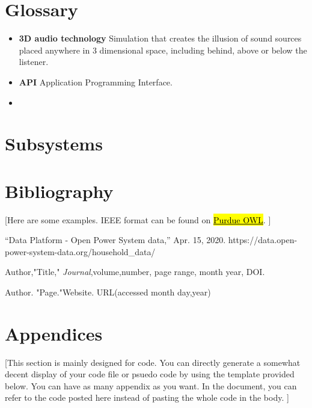 \documentclass[letterpaper, 11pt]{article}
\begin{document}
\clearpage
\section*{Glossary} %
\begin{itemize} %
    \item \textbf{3D audio technology} Simulation that creates
          the illusion of sound sources placed anywhere in 3
          dimensional space, including behind, above or below the listener.
    \item \textbf{API} Application Programming Interface.
    \item
\end{itemize}





\clearpage
\section{Subsystems}





\clearpage
\section{Bibliography}

 [Here are some examples. IEEE format can be found on \href{https://owl.purdue.edu/owl/research_and_citation/ieee_style/ieee_overview.html}{\hl{Purdue OWL}}. ]

\begin{thebibliography}{}

    “Data Platform - Open Power System data,” Apr. 15, 2020. https://data.open-power-system-data.org/household\_data/

    Author,"Title," \emph{Journal},volume,number, page range, month year, DOI.

    Author. "Page."Website. URL(accessed month day,year)

\end{thebibliography}

\clearpage
\section{Appendices}
 [This section is mainly designed for code. You can directly generate a somewhat decent display of your code file or psuedo code by using the template provided below. You can have as many appendix as you want. In the document, you can refer to the code posted here instead of pasting the whole code in the body. ]
\end{document}
